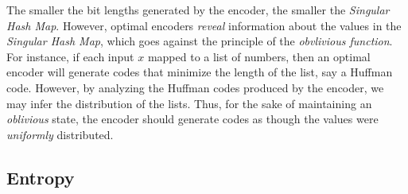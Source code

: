 \documentclass[ ../main.tex]{subfiles}
\begin{document}
The smaller the bit lengths generated by the encoder, the smaller the \emph{Singular Hash Map}. However, optimal encoders \emph{reveal} information about the values in the \emph{Singular Hash Map}, which goes against the principle of the \emph{obvlivious function}. For instance, if each input $x$ mapped to a list of numbers, then an optimal encoder will generate codes that minimize the length of the list, say a Huffman code. However, by analyzing the Huffman codes produced by the encoder, we may infer the distribution of the lists. Thus, for the sake of maintaining an \emph{oblivious} state, the encoder should generate codes as though the values were \emph{uniformly} distributed.

\subsection{Entropy}
\end{document}
